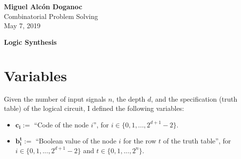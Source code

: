 \documentclass[letterpaper,10pt]{article}
\begin{document}
\noindent
\begin{flushright}
    \large\textbf{Miguel Alcón Doganoc} \\
    Combinatorial Problem Solving \\
    May 7, 2019
\end{flushright}

\noindent
{\huge{\textbf{Logic Synthesis}}}

\section{Variables}
Given the number of input signals $n$, the depth $d$, and the specification (truth table) of the logical circuit, I defined the following variables:
\begin{itemize}
    \item $\mathbf{c_{i}}:=$ ``Code of the node $i$'', for $i \in \{0,1,...,2^{d+1}-2\}$.
    \item $\mathbf{b_{i}^t}:=$ ``Boolean value of the node $i$ for the row $t$ of the truth table'', for $i \in \{0,1,...,2^{d+1}-2\}$ and $t \in \{0,1,...,2^n\}$.
\end{itemize}
\end{document}
